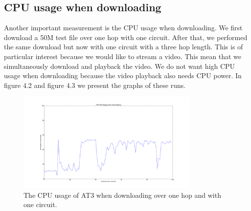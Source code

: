 		\subsection{CPU usage when downloading}
			Another important measurement is the CPU usage when downloading. We first download a 50M test file over one hop with one circuit. After that, we performed the same download but now with one circuit with a three hop length. This is of particular interest because we would like to stream a video. This mean that we simultaneously download and playback the video. We do not want high CPU usage when downloading because the video playback also needs CPU power. In figure 4.2 and figure 4.3 we present the graphs of these runs.
			
			\begin{figure}[!t]
				\centering
				\includegraphics[width=0.8\textwidth]{graphics/cpu_downloading.pdf}
				\caption{The CPU usage of AT3 when downloading over one hop and with one circuit.}
				\label{fig:cpu_idle_graph}
			\end{figure}